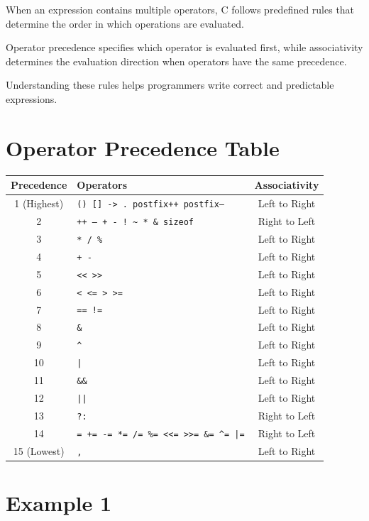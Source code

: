 \documentclass[12pt,openany]{book}
\begin{document}
When an expression contains multiple operators, C follows predefined rules that determine the order in which operations are evaluated.

Operator precedence specifies which operator is evaluated first, while associativity determines the evaluation direction when operators have the same precedence.

Understanding these rules helps programmers write correct and predictable expressions.

\section{Operator Precedence Table}

\begin{center}
\small
\begin{tabular}{|c|p{6cm}|c|}
\hline
Precedence & Operators & Associativity \\
\hline
1 (Highest) & \texttt{() [] -> . postfix++ postfix--} & Left to Right \\
2 & \texttt{++ -- + - ! \textasciitilde\ * \& sizeof} & Right to Left \\
3 & \texttt{* / \%} & Left to Right \\
4 & \texttt{+ -} & Left to Right \\
5 & \texttt{<< >>} & Left to Right \\
6 & \texttt{< <= > >=} & Left to Right \\
7 & \texttt{== !=} & Left to Right \\
8 & \texttt{\&} & Left to Right \\
9 & \texttt{\^{}} & Left to Right \\
10 & \texttt{|} & Left to Right \\
11 & \texttt{\&\&} & Left to Right \\
12 & \texttt{||} & Left to Right \\
13 & \texttt{?:} & Right to Left \\
14 & \texttt{= += -= *= /= \%= <<= >>= \&= \^{}= |=} & Right to Left \\
15 (Lowest) & \texttt{,} & Left to Right \\
\hline
\end{tabular}
\end{center}

\section{Example 1}
\end{document}
